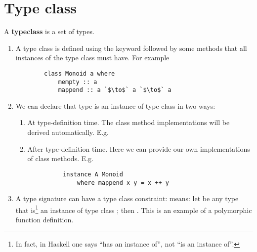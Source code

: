 \documentclass[12pt]{article}
\begin{document}
\section{Type class}
\begin{definition*}
  A {\bf typeclass} is a set of types.
\end{definition*}

\begin{remark*}\hspace{0pt}
  \begin{enumerate}
  \item A type class is defined using the  keyword followed by some methods that all
    instances of the type class must have. For example
    \begin{normalfont}
      \begin{verbatim}
        class Monoid a where
            mempty :: a
            mappend :: a `$\to$` a `$\to$` a
      \end{verbatim}
    \end{normalfont}
  \item We can declare that type  is an instance of type class  in two ways:
    \begin{enumerate}
    \item At type-definition time. The class method implementations will be derived
      automatically. E.g. 
    \item After type-definition time. Here we can provide our own implementations of class
      methods. E.g.
      \begin{normalfont}
        \begin{verbatim}
          instance A Monoid
              where mappend x y = x ++ y
        \end{verbatim}
      \end{normalfont}
    \end{enumerate}
  \item A type signature can have a type class constraint:  means: let
     be any type that is\footnote{In fact, in Haskell one says ``has an instance of'', not
      ``is an instance of''.} an instance of type class ; then . This is an
    example of a polymorphic function definition.
  \end{enumerate}
\end{remark*}
\end{document}

